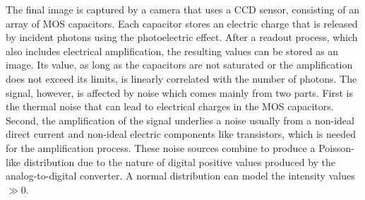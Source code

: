 \par
%
The final image is captured by a camera that uses a \ac{CCD} sensor, consisting of an array of \ac{MOS} capacitors.
Each capacitor stores an electric charge that is released by incident photons using the photoelectric effect.
After a readout process, which also includes electrical amplification, the resulting values can be stored as an image.
Its value, as long as the capacitors are not saturated or the amplification does not exceed its limits, is linearly correlated with the number of photons.
The signal, however, is affected by noise which comes mainly from two parts.
First is the thermal noise that can lead to electrical charges in the \ac{MOS} capacitors. 
Second, the amplification of the signal underlies a noise usually from a non-ideal direct current and non-ideal electric components like transistors, which is needed for the amplification process.
These noise sources combine to produce a Poisson-like distribution due to the nature of digital positive values produced by the analog-to-digital converter.
A normal distribution can model the intensity values $\gg 0$.
%
%
%
